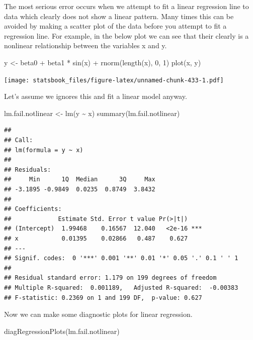 \documentclass[
]{book}
\newenvironment{Shaded}{\begin{snugshade}}{\end{snugshade}}
\newcommand{\DecValTok}[1]{\textcolor[rgb]{0.00,0.00,0.81}{#1}}
\newcommand{\FunctionTok}[1]{\textcolor[rgb]{0.00,0.00,0.00}{#1}}
\newcommand{\NormalTok}[1]{#1}
\newcommand{\OtherTok}[1]{\textcolor[rgb]{0.56,0.35,0.01}{#1}}
\newcommand{\SpecialCharTok}[1]{\textcolor[rgb]{0.00,0.00,0.00}{#1}}
\theoremstyle{definition}
\theoremstyle{definition}
\theoremstyle{definition}
\theoremstyle{definition}
\theoremstyle{remark}
\begin{document}
The most serious error occurs when we attempt to fit a linear regression line to data which clearly does not show a linear pattern. Many times this can be avoided by making a scatter plot of the data before you attempt to fit a regression line. For example, in the below plot we can see that their clearly is a nonlinear relationship between the variables x and y.

\begin{Shaded}
\begin{Highlighting}[]
\NormalTok{y }\OtherTok{\textless{}{-}}\NormalTok{ beta0 }\SpecialCharTok{+}\NormalTok{ beta1 }\SpecialCharTok{*} \FunctionTok{sin}\NormalTok{(x) }\SpecialCharTok{+} \FunctionTok{rnorm}\NormalTok{(}\FunctionTok{length}\NormalTok{(x), }\DecValTok{0}\NormalTok{, }\DecValTok{1}\NormalTok{)}
\FunctionTok{plot}\NormalTok{(x, y)}
\end{Highlighting}
\end{Shaded}

\texttt{[image: statsbook\_files/figure-latex/unnamed-chunk-433-1.pdf]}

Let's assume we ignores this and fit a linear model anyway.

\begin{Shaded}
\begin{Highlighting}[]
\NormalTok{lm.fail.notlinear }\OtherTok{\textless{}{-}} \FunctionTok{lm}\NormalTok{(y }\SpecialCharTok{\textasciitilde{}}\NormalTok{ x)}
\FunctionTok{summary}\NormalTok{(lm.fail.notlinear)}
\end{Highlighting}
\end{Shaded}

\begin{verbatim}
## 
## Call:
## lm(formula = y ~ x)
## 
## Residuals:
##     Min      1Q  Median      3Q     Max 
## -3.1895 -0.9849  0.0235  0.8749  3.8432 
## 
## Coefficients:
##             Estimate Std. Error t value Pr(>|t|)    
## (Intercept)  1.99468    0.16567  12.040   <2e-16 ***
## x            0.01395    0.02866   0.487    0.627    
## ---
## Signif. codes:  0 '***' 0.001 '**' 0.01 '*' 0.05 '.' 0.1 ' ' 1
## 
## Residual standard error: 1.179 on 199 degrees of freedom
## Multiple R-squared:  0.001189,   Adjusted R-squared:  -0.00383 
## F-statistic: 0.2369 on 1 and 199 DF,  p-value: 0.627
\end{verbatim}

Now we can make some diagnostic plots for linear regression.

\begin{Shaded}
\begin{Highlighting}[]
\FunctionTok{diagRegressionPlots}\NormalTok{(lm.fail.notlinear)}
\end{Highlighting}
\end{Shaded}
\end{document}
